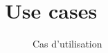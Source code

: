 \documentclass[letterpaper,10pt,oneside]{sphinxmanual}
\begin{document}
\section{Use cases}
\label{schemas:use-cases}\begin{figure}[htbp]
\centering
\capstart

\caption{Cas d'utilisation}\end{figure}
\end{document}
